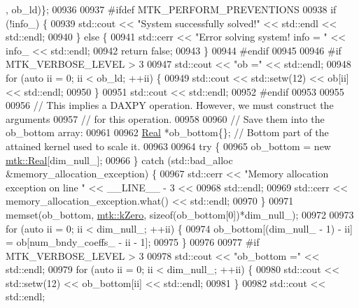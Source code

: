 \begin{DoxyCode}
{{      , ob\_ld)\};
00936 
00937 \textcolor{preprocessor}{    #ifdef MTK\_PERFORM\_PREVENTIONS}
00938     \textcolor{keywordflow}{if} (!info\_) \{
00939       std::cout << \textcolor{stringliteral}{"System successfully solved!"} << std::endl << std::endl;
00940     \} \textcolor{keywordflow}{else} \{
00941       std::cerr << \textcolor{stringliteral}{"Error solving system! info = "} << info\_ << std::endl;
00942       \textcolor{keywordflow}{return} \textcolor{keyword}{false};
00943     \}
00944 \textcolor{preprocessor}{    #endif}
00945 
00946 \textcolor{preprocessor}{    #if MTK\_VERBOSE\_LEVEL > 3}
00947     std::cout << \textcolor{stringliteral}{"ob ="} << std::endl;
00948     \textcolor{keywordflow}{for} (\textcolor{keyword}{auto} ii = 0; ii < ob\_ld; ++ii) \{
00949       std::cout << std::setw(12) << ob[ii] << std::endl;
00950     \}
00951     std::cout << std::endl;
00952 \textcolor{preprocessor}{    #endif}
00953 
00955 
00956     \textcolor{comment}{// This implies a DAXPY operation. However, we must construct the arguments}
00957     \textcolor{comment}{// for this operation.}
00958 
00960     \textcolor{comment}{// Save them into the ob\_bottom array:}
00961 
00962     \hyperlink{group__c01-roots_gac080bbbf5cbb5502c9f00405f894857d}{Real} *ob\_bottom\{\}; \textcolor{comment}{// Bottom part of the attained kernel used to scale it.}
00963 
00964     \textcolor{keywordflow}{try} \{
00965       ob\_bottom = \textcolor{keyword}{new} \hyperlink{group__c01-roots_gac080bbbf5cbb5502c9f00405f894857d}{mtk::Real}[dim\_null\_];
00966     \} \textcolor{keywordflow}{catch} (std::bad\_alloc &memory\_allocation\_exception) \{
00967       std::cerr << \textcolor{stringliteral}{"Memory allocation exception on line "} << \_\_LINE\_\_ - 3 <<
00968         std::endl;
00969       std::cerr << memory\_allocation\_exception.what() << std::endl;
00970     \}
00971     memset(ob\_bottom, \hyperlink{group__c01-roots_ga59a451a5fae30d59649bcda274fea271}{mtk::kZero}, \textcolor{keyword}{sizeof}(ob\_bottom[0])*dim\_null\_);
00972 
00973     \textcolor{keywordflow}{for} (\textcolor{keyword}{auto} ii = 0; ii < dim\_null\_; ++ii) \{
00974       ob\_bottom[(dim\_null\_ - 1) - ii] = ob[num\_bndy\_coeffs\_ - ii - 1];
00975     \}
00976 
00977 \textcolor{preprocessor}{    #if MTK\_VERBOSE\_LEVEL > 3}
00978     std::cout << \textcolor{stringliteral}{"ob\_bottom ="} << std::endl;
00979     \textcolor{keywordflow}{for} (\textcolor{keyword}{auto} ii = 0; ii < dim\_null\_; ++ii) \{
00980       std::cout << std::setw(12) << ob\_bottom[ii] << std::endl;
00981     \}
00982     std::cout << std::endl;
}}
\end{DoxyCode}

